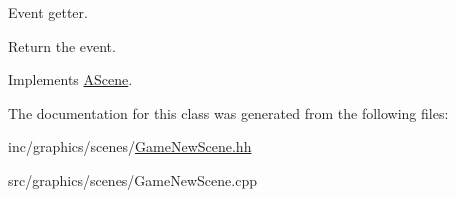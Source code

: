Event getter. 

Return the event. 

Implements \hyperlink{classAScene_af521e5e6d30a5d2e5d30eb333e4d3abd}{A\+Scene}.



The documentation for this class was generated from the following files\+:\begin{DoxyCompactItemize}
\item 
inc/graphics/scenes/\hyperlink{GameNewScene_8hh}{Game\+New\+Scene.\+hh}\item 
src/graphics/scenes/Game\+New\+Scene.\+cpp\end{DoxyCompactItemize}
